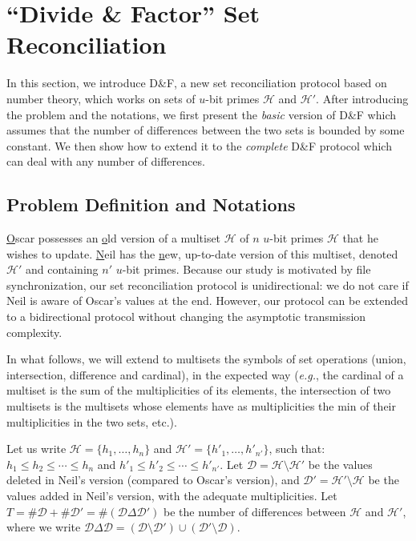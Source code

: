 \documentclass[twoside,envcountsame,runningheads]{llncs}
\newcommand{\Set}{\mathcal{H}}
\newcommand{\SetD}{\mathcal{D}}
\newcommand{\df}{D\&F\xspace}
\newcommand{\eg}{\textit{e.g.}\xspace}
\newcommand{\comm}[1]{\todo{#1}}
\begin{document}
\section{``Divide \& Factor'' Set Reconciliation}
\label{sec:dandf}

In this section, we introduce \df, a new set reconciliation protocol based on number theory, which works on sets of $u$-bit primes $\Set$ and $\Set'$.
After introducing the problem and the notations, we first present the \emph{basic} version of \df which assumes that the number of differences between the two sets is bounded by some constant.
We then show how to extend it to the \emph{complete} \df protocol which can deal with any number of differences.

\subsection{Problem Definition and Notations}

\underline{O}scar possesses an \underline{o}ld version of a multiset $\Set$ of $n$ $u$-bit primes $\Set$ that he wishes to update.
\underline{N}eil has the \underline{n}ew, up-to-date version of this multiset, denoted $\Set'$ and containing $n'$ $u$-bit primes.
Because our study is motivated by file synchronization, our set reconciliation protocol is unidirectional: we do not care if Neil is aware of Oscar's values at the end. However, our protocol can be extended to a bidirectional protocol without changing the asymptotic transmission complexity.

In what follows, we will extend to multisets the symbols of set operations (union, intersection, difference and cardinal), in the expected way (\eg, the cardinal of a multiset is the sum of the multiplicities of its elements, the intersection of two multisets is the multisets whose elements have as multiplicities the min of their multiplicities in the two sets, etc.).

Let us write $\Set = \{h_1,\dots,h_n\}$ and $\Set' = \{h'_1,\dots,h'_{n'}\}$, such that: $h_1 \leq h_2 \leq \cdots \leq h_n$ and $h'_1 \leq h'_2 \leq \cdots \leq h'_{n'}$.
Let $\SetD = \Set \setminus \Set'$ be the values deleted in Neil's version (compared to Oscar's version), and $\SetD' = \Set' \setminus \Set$ be the values added in Neil's version, with the adequate multiplicities.
Let $T = \# \SetD + \# \SetD' = \# \left( \SetD \Delta \SetD' \right)$ be the number of differences between $\Set$ and $\Set'$, where we write
$ \SetD \Delta \SetD = (\SetD \setminus \SetD') \cup (\SetD' \setminus \SetD)$.
\end{document}
